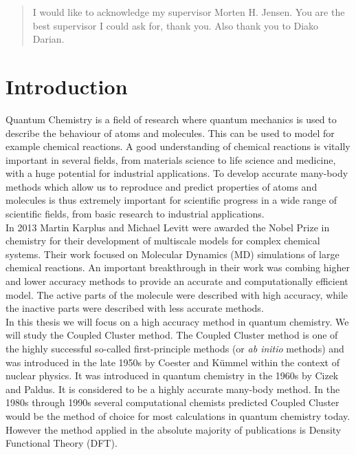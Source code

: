 \documentclass[a4paper,norsk,11pt,twoside]{report}
\begin{document}
\renewcommand{\abstractname}{Acknowledgements}
\begin{abstract}
I would like to acknowledge my supervisor Morten H. Jensen. You are the best supervisor I could ask for, thank you. Also thank you to Diako Darian. 
\end{abstract}


\tableofcontents{}

\maketitle
\newpage




\chapter{Introduction}

Quantum Chemistry is a field of research where quantum mechanics is
used to describe the behaviour of atoms and molecules. This can be
used to model for example chemical reactions. A good understanding of
chemical reactions is vitally important in several fields, from
materials science to life science and medicine, with a huge potential
for industrial applications. To develop accurate many-body methods
which allow us to reproduce and predict properties of atoms and
molecules is thus extremely important for scientific progress in a
wide range of scientific fields, from basic research to industrial
applications. \\

In 2013 Martin Karplus and Michael Levitt were awarded the Nobel Prize
in chemistry for their development of multiscale models for complex
chemical systems. Their work focused on Molecular Dynamics (MD)
simulations of large chemical reactions. An important breakthrough in
their work was combing higher and lower accuracy methods to provide an
accurate and computationally efficient model. The active parts of the
molecule were described with high accuracy, while the inactive parts
were described with less accurate methods. \\

In this thesis we will focus on a high accuracy method in quantum
chemistry. We will study the Coupled Cluster method. The Coupled Cluster method is one of the highly successful so-called first-principle methods (or {\em ab initio} methods) and  
was introduced in the late 1950s by Coester and K\"ummel within the context of nuclear physics. 
It was introduced in quantum chemistry in the 1960s by Cizek and Paldus. 
It is considered
to be a highly accurate many-body method. In the 1980s through 1990s several
computational chemists predicted Coupled Cluster would be the method
of choice for most calculations in quantum chemistry today. However
the method applied in the absolute majority of publications is 
Density Functional Theory (DFT).  \\
\end{document}
